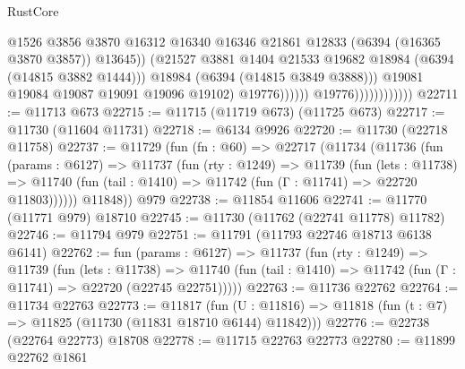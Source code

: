 \begin{lexlean}{RustCore}
\begin{coremodule}
                                                @1526
                                                @3856
                                                @3870
                                                @16312
                                                @16340
                                                @16346
                                                @21861
                                                @12833
                                                (@6394 (@16365 @3870 @3857))
                                                @13645))
                                            (@21527
                                              @3881
                                              @1404
                                              @21533
                                              @19682
                                              @18984
                                              (@6394 (@14815 @3882 @1444)))
                                            @18984
                                            (@6394 (@14815 @3849 @3888)))
                                          @19081
                                          @19084
                                          @19087
                                          @19091
                                          @19096
                                          @19102)
                                        @19776))))))
                            @19776))))))))))))
@22711 := @11713 @673
@22715 := @11715 (@11719 @673) (@11725 @673)
@22717 := @11730 (@11604 @11731)
@22718 := @6134 @9926
@22720 := @11730 (@22718 @11758)
@22737 := @11729
    (fun (fn : @60) =>
    @22717
      (@11734
        (@11736
          (fun (params : @6127) =>
          @11737
            (fun (rty : @1249) =>
            @11739
              (fun (lets : @11738) =>
              @11740 (fun (tail : @1410) => @11742 (fun (Γ : @11741) => @22720 @11803))))))
        @11848))
    @979
@22738 := @11854 @11606
@22741 := @11770 (@11771 @979) @18710
@22745 := @11730 (@11762 (@22741 @11778) @11782)
@22746 := @11794 @979
@22751 := @11791 (@11793 @22746 @18713 @6138 @6141)
@22762 := fun (params : @6127) =>
  @11737
    (fun (rty : @1249) =>
    @11739
      (fun (lets : @11738) =>
      @11740 (fun (tail : @1410) => @11742 (fun (Γ : @11741) => @22720 (@22745 @22751)))))
@22763 := @11736 @22762
@22764 := @11734 @22763
@22773 := @11817
    (fun (U : @11816) => @11818 (fun (t : @7) => @11825 (@11730 (@11831 @18710 @6144) @11842)))
@22776 := @22738 (@22764 @22773) @18708
@22778 := @11715 @22763 @22773
@22780 := @11899 @22762 @1861

\end{coremodule}
\end{lexlean}

